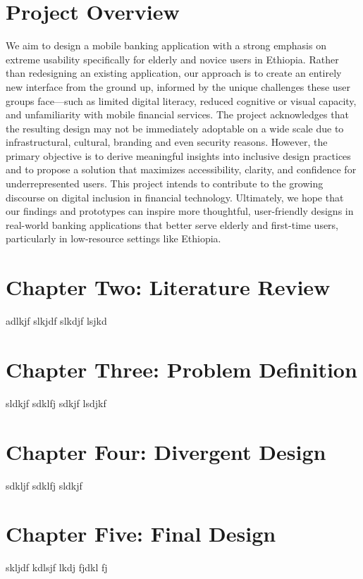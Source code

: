 \documentclass[a4paper,12pt]{report}
\begin{document}
\section{Project Overview}
We aim to design a mobile banking application with a strong emphasis on extreme usability specifically for elderly and novice users in Ethiopia. Rather than redesigning an existing application, our approach is to create an entirely new interface from the ground up, informed by the unique challenges these user groups face—such as limited digital literacy, reduced cognitive or visual capacity, and unfamiliarity with mobile financial services. The project acknowledges that the resulting design may not be immediately adoptable on a wide scale due to infrastructural, cultural, branding and even security reasons. However, the primary objective is to derive meaningful insights into inclusive design practices and to propose a solution that maximizes accessibility, clarity, and confidence for underrepresented users. This project intends to contribute to the growing discourse on digital inclusion in financial technology. Ultimately, we hope that our findings and prototypes can inspire more thoughtful, user-friendly designs in real-world banking applications that better serve elderly and first-time users, particularly in low-resource settings like Ethiopia.

\newpage
\section*{Chapter Two: Literature Review}
adlkjf slkjdf slkdjf lsjkd
\vfill

\newpage
\section*{Chapter Three: Problem Definition}
sldkjf sdklfj sdkjf lsdjkf
\vfill

\newpage
\section*{Chapter Four: Divergent Design}
sdkljf sdklfj sldkjf
\vfill

\newpage
\section*{Chapter Five: Final Design}
skljdf kdlsjf lkdj fjdkl fj
\vfill
\end{document}
